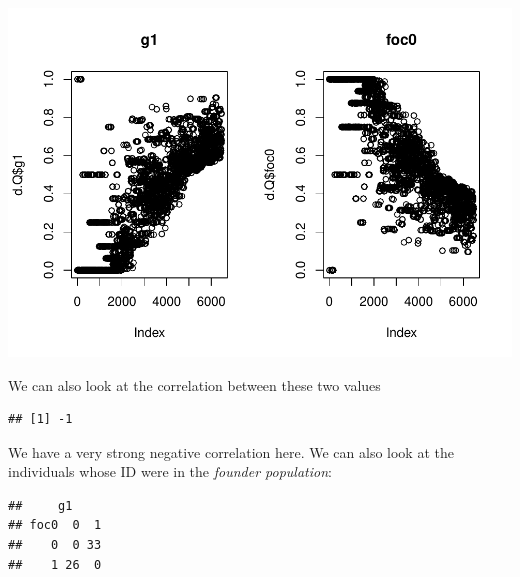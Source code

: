 \documentclass[
]{article}
\newenvironment{Shaded}{\begin{snugshade}}{\end{snugshade}}
\newcommand{\FunctionTok}[1]{\textcolor[rgb]{0.00,0.00,0.00}{#1}}
\newcommand{\NormalTok}[1]{#1}
\newcommand{\OtherTok}[1]{\textcolor[rgb]{0.56,0.35,0.01}{#1}}
\newcommand{\SpecialCharTok}[1]{\textcolor[rgb]{0.00,0.00,0.00}{#1}}
\newcommand{\StringTok}[1]{\textcolor[rgb]{0.31,0.60,0.02}{#1}}
\begin{document}
\includegraphics{EDA_files/figure-latex/unnamed-chunk-2-1.pdf}

We can also look at the correlation between these two values

\begin{Shaded}
\end{Shaded}

\begin{verbatim}
## [1] -1
\end{verbatim}

We have a very strong negative correlation here. We can also look at the
individuals whose ID were in the \emph{founder population}:

\begin{Shaded}
\end{Shaded}

\begin{verbatim}
##     g1
## foc0  0  1
##    0  0 33
##    1 26  0
\end{verbatim}
\end{document}
